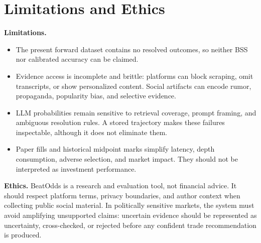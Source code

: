 \section{Limitations and Ethics}

\textbf{Limitations.}
\begin{itemize}[leftmargin=*]
  \item The present forward dataset contains no resolved outcomes, so neither BSS nor calibrated accuracy can be claimed.
  \item Evidence access is incomplete and brittle: platforms can block scraping, omit transcripts, or show personalized content. Social artifacts can encode rumor, propaganda, popularity bias, and selective evidence.
  \item LLM probabilities remain sensitive to retrieval coverage, prompt framing, and ambiguous resolution rules. A stored trajectory makes these failures inspectable, although it does not eliminate them.
  \item Paper fills and historical midpoint marks simplify latency, depth consumption, adverse selection, and market impact. They should not be interpreted as investment performance.
\end{itemize}

\textbf{Ethics.} BeatOdds is a research and evaluation tool, not financial advice. It should respect platform terms, privacy boundaries, and author context when collecting public social material. In politically sensitive markets, the system must avoid amplifying unsupported claims: uncertain evidence should be represented as uncertainty, cross-checked, or rejected before any confident trade recommendation is produced.
